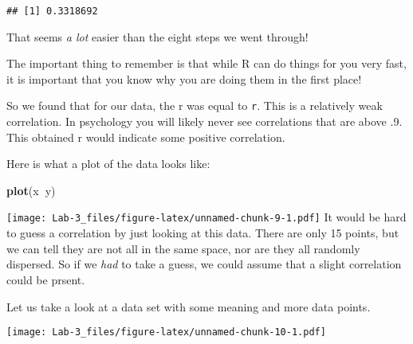 \documentclass[]{article}
\newenvironment{Shaded}{\begin{snugshade}}{\end{snugshade}}
\newcommand{\KeywordTok}[1]{\textcolor[rgb]{0.13,0.29,0.53}{\textbf{#1}}}
\newcommand{\DataTypeTok}[1]{\textcolor[rgb]{0.13,0.29,0.53}{#1}}
\newcommand{\StringTok}[1]{\textcolor[rgb]{0.31,0.60,0.02}{#1}}
\newcommand{\OperatorTok}[1]{\textcolor[rgb]{0.81,0.36,0.00}{\textbf{#1}}}
\newcommand{\NormalTok}[1]{#1}
\begin{document}
\begin{verbatim}
## [1] 0.3318692
\end{verbatim}

That seems \emph{a lot} easier than the eight steps we went through!

The important thing to remember is that while R can do things for you
very fast, it is important that you know why you are doing them in the
first place!

So we found that for our data, the r was equal to \texttt{r}. This is a
relatively weak correlation. In psychology you will likely never see
correlations that are above .9. This obtained r would indicate some
positive correlation.

Here is what a plot of the data looks like:

\begin{Shaded}
\begin{Highlighting}[]
\KeywordTok{plot}\NormalTok{(x}\OperatorTok{~}\NormalTok{y)}
\end{Highlighting}
\end{Shaded}

\texttt{[image: Lab-3\_files/figure-latex/unnamed-chunk-9-1.pdf]} It
would be hard to guess a correlation by just looking at this data. There
are only 15 points, but we can tell they are not all in the same space,
nor are they all randomly dispersed. So if we \emph{had} to take a
guess, we could assume that a slight correlation could be prsent.

Let us take a look at a data set with some meaning and more data points.

\begin{Shaded}
\end{Shaded}

\texttt{[image: Lab-3\_files/figure-latex/unnamed-chunk-10-1.pdf]}

\begin{Shaded}
\end{Shaded}
\end{document}

